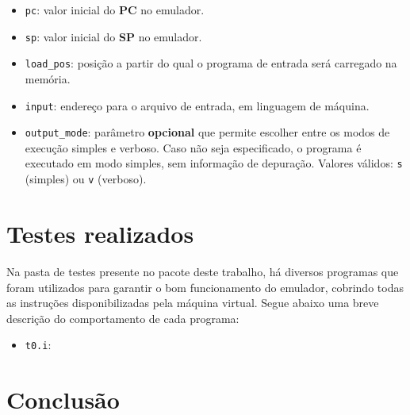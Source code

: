 \documentclass[10pt,a4paper]{article}
\numberwithin{equation}{section}
\begin{document}
\begin{itemize}
    \item \verb|pc|: valor inicial do \textbf{PC} no emulador.
    \item \verb|sp|: valor inicial do \textbf{SP} no emulador.
    \item \verb|load_pos|: posição a partir do qual o programa de entrada será carregado na memória.
    \item \verb|input|: endereço para o arquivo de entrada, em linguagem de máquina.
    \item \verb|output_mode|: parâmetro \textbf{opcional} que permite escolher entre os modos de execução simples e verboso. Caso não seja especificado, o programa é executado em modo simples, sem informação de depuração. Valores válidos: \verb|s| (simples) ou \verb|v| (verboso).
\end{itemize}

\section{Testes realizados}

Na pasta de testes presente no pacote deste trabalho, há diversos programas que foram utilizados para garantir o bom funcionamento do emulador, cobrindo todas as instruções disponibilizadas pela máquina virtual. Segue abaixo uma breve descrição do comportamento de cada programa:

\begin{itemize}
    \item \verb|t0.i|: 
\end{itemize}

\section{Conclusão}
\end{document}
